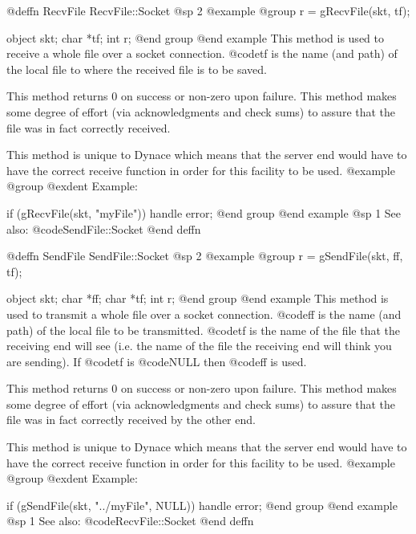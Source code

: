 @deffn {RecvFile} RecvFile::Socket
@sp 2
@example
@group
r = gRecvFile(skt, tf);

object  skt;
char    *tf;
int     r;
@end group
@end example
This method is used to receive a whole file over a socket connection.
@code{tf} is the name (and path) of the local file to where the received
file is to be saved.

This method returns 0 on success or non-zero upon failure.  This method
makes some degree of effort (via acknowledgments and check sums) to assure
that the file was in fact correctly received.

This method is unique to Dynace which means that the server end would
have to have the correct receive function in order for this facility
to be used.
@example
@group
@exdent Example:
 
if (gRecvFile(skt, "myFile"))
      handle error;
@end group
@end example
@sp 1
See also:  @code{SendFile::Socket}
@end deffn

















@deffn {SendFile} SendFile::Socket
@sp 2
@example
@group
r = gSendFile(skt, ff, tf);

object  skt;
char    *ff;
char    *tf;
int     r;
@end group
@end example
This method is used to transmit a whole file over a socket connection.
@code{ff} is the name (and path) of the local file to be transmitted.
@code{tf} is the name of the file that the receiving end will see
(i.e. the name of the file the receiving end will think you are
sending).  If @code{tf} is @code{NULL} then @code{ff} is used.

This method returns 0 on success or non-zero upon failure.  This method
makes some degree of effort (via acknowledgments and check sums) to assure
that the file was in fact correctly received by the other end.

This method is unique to Dynace which means that the server end would
have to have the correct receive function in order for this facility
to be used.
@example
@group
@exdent Example:
 
if (gSendFile(skt, "../myFile", NULL))
      handle error;
@end group
@end example
@sp 1
See also:  @code{RecvFile::Socket}
@end deffn









